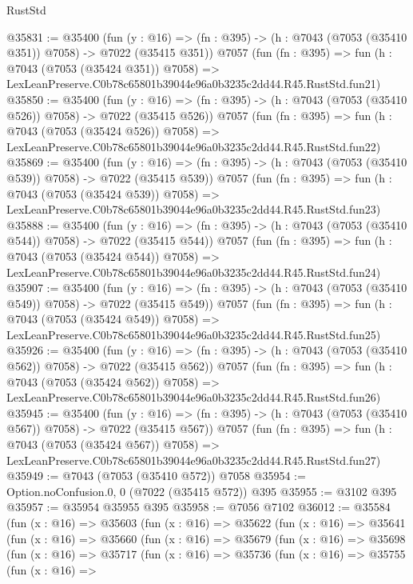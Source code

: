 \begin{lexlean}{RustStd}
\begin{coremodule}
@35831 := @35400
    (fun (y : @16) => (fn : @395) -> (h : @7043 (@7053 (@35410 @351)) @7058) -> @7022 (@35415 @351))
    @7057
    (fun (fn : @395) =>
    fun (h : @7043 (@7053 (@35424 @351)) @7058) =>
    LexLeanPreserve.C0b78c65801b39044e96a0b3235c2dd44.R45.RustStd.fun21)
@35850 := @35400
    (fun (y : @16) => (fn : @395) -> (h : @7043 (@7053 (@35410 @526)) @7058) -> @7022 (@35415 @526))
    @7057
    (fun (fn : @395) =>
    fun (h : @7043 (@7053 (@35424 @526)) @7058) =>
    LexLeanPreserve.C0b78c65801b39044e96a0b3235c2dd44.R45.RustStd.fun22)
@35869 := @35400
    (fun (y : @16) => (fn : @395) -> (h : @7043 (@7053 (@35410 @539)) @7058) -> @7022 (@35415 @539))
    @7057
    (fun (fn : @395) =>
    fun (h : @7043 (@7053 (@35424 @539)) @7058) =>
    LexLeanPreserve.C0b78c65801b39044e96a0b3235c2dd44.R45.RustStd.fun23)
@35888 := @35400
    (fun (y : @16) => (fn : @395) -> (h : @7043 (@7053 (@35410 @544)) @7058) -> @7022 (@35415 @544))
    @7057
    (fun (fn : @395) =>
    fun (h : @7043 (@7053 (@35424 @544)) @7058) =>
    LexLeanPreserve.C0b78c65801b39044e96a0b3235c2dd44.R45.RustStd.fun24)
@35907 := @35400
    (fun (y : @16) => (fn : @395) -> (h : @7043 (@7053 (@35410 @549)) @7058) -> @7022 (@35415 @549))
    @7057
    (fun (fn : @395) =>
    fun (h : @7043 (@7053 (@35424 @549)) @7058) =>
    LexLeanPreserve.C0b78c65801b39044e96a0b3235c2dd44.R45.RustStd.fun25)
@35926 := @35400
    (fun (y : @16) => (fn : @395) -> (h : @7043 (@7053 (@35410 @562)) @7058) -> @7022 (@35415 @562))
    @7057
    (fun (fn : @395) =>
    fun (h : @7043 (@7053 (@35424 @562)) @7058) =>
    LexLeanPreserve.C0b78c65801b39044e96a0b3235c2dd44.R45.RustStd.fun26)
@35945 := @35400
    (fun (y : @16) => (fn : @395) -> (h : @7043 (@7053 (@35410 @567)) @7058) -> @7022 (@35415 @567))
    @7057
    (fun (fn : @395) =>
    fun (h : @7043 (@7053 (@35424 @567)) @7058) =>
    LexLeanPreserve.C0b78c65801b39044e96a0b3235c2dd44.R45.RustStd.fun27)
@35949 := @7043 (@7053 (@35410 @572)) @7058
@35954 := Option.noConfusion.{0, 0} (@7022 (@35415 @572)) @395
@35955 := @3102 @395
@35957 := @35954 @35955 @395
@35958 := @7056 @7102
@36012 := @35584
    (fun (x : @16) =>
    @35603
      (fun (x : @16) =>
      @35622
        (fun (x : @16) =>
        @35641
          (fun (x : @16) =>
          @35660
            (fun (x : @16) =>
            @35679
              (fun (x : @16) =>
              @35698
                (fun (x : @16) =>
                @35717
                  (fun (x : @16) =>
                  @35736
                    (fun (x : @16) =>
                    @35755
                      (fun (x : @16) =>

\end{coremodule}
\end{lexlean}
